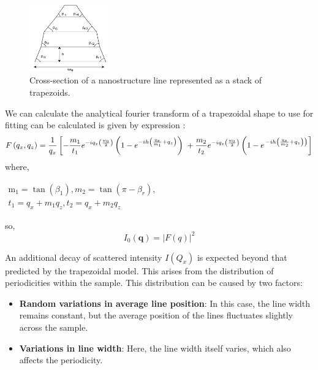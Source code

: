 \begin{figure}[h]
    \centering
    \includegraphics[width=0.3\textwidth]{images/trapezoid.png}
    \caption{Cross-section of a nanostructure line represented as a stack of trapezoids.}
    \label{fig:trapezoid_model}
    
\end{figure}
We can calculate the analytical fourier transform of a trapezoidal shape to use for fitting
can be calculated is given by expression \cite{sunday_2015}:
\begin{equation}
    F\left(q_{x}, q_{z}\right)=\frac{1}{q_{x}}\left[-\frac{m_{1}}{t_{1}} e^{-i q_{x}\left(\frac{\omega_{0}}{2}\right)}\left(1-e^{-i h\left(\frac{q_{x}}{m_{1}}+q_{z}\right)}\right)\right. \\ +\frac{m_{2}}{t_{2}} e^{-i q_{x}\left(\frac{\omega_{0}}{2}\right)}\left(1-e^{\left.-i h\left(\frac{q_{x}}{m_{2}}+q_{z}\right)\right)}\right]
    \label{eq:trapezoidal_ft}
\end{equation}
where,

\( \begin{array}{l}\mathrm{m}_{1}=\tan \left(\beta_{1}\right) , m_{2}=\tan \left(\pi-\beta_{r}\right), \\ t_{1}= q_{x}+m_{1} q_{z}, t_{2}= q_{x}+m_{2} q_{z}\end{array} \)

\medskip

so,
\begin{equation}
    I_{0}(\mathbf{q}) = |F(q)|^{2}
\end{equation}

An additional decay of scattered intensity $I(Q_{x})$ is expected beyond that predicted by the trapezoidal model.
This arises from the distribution of periodicities within the sample. This distribution 
can be caused by two factors:
\begin{itemize}
    \item \textbf{Random variations in average line position}: In this case, the line width remains
         constant, but the average position of the lines fluctuates slightly across the 
         sample.
    \item \textbf{Variations in line width}: Here, the line width itself varies, 
        which also affects the periodicity.
\end{itemize}

